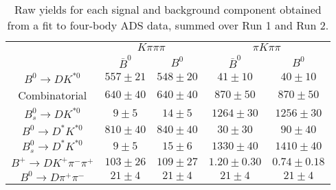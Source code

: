 \begin{table}
  \centering
  \begin{tabular}{ccccc}
      \toprule
       & \multicolumn{2}{c}{$K\pi\pi\pi$} & \multicolumn{2}{c}{$\pi K\pi\pi$} \\
      & $\bar{B}^0$ & $B^0$& $\bar{B}^0$ & $B^0$ \\
      \midrule
      $B^0 \to DK^{*0}$ & $557 \pm 21$ & $548 \pm 20$ & $41 \pm 10$ & $40 \pm 10$ \\
      Combinatorial & $640 \pm 40$ & $640 \pm 40$ & $870 \pm 50$ & $870 \pm 50$ \\
      $B^0_s \to DK^{*0}$ & $9 \pm 5$ & $14 \pm 5$ & $1264 \pm 30$ & $1256 \pm 30$ \\
      $B^0 \to D^*K^{*0}$ & $810 \pm 40$ & $840 \pm 40$ & $30 \pm 30$ & $90 \pm 40$ \\
      $B^0_s \to D^*K^{*0}$ & $9 \pm 5$ & $15 \pm 6$ & $1330 \pm 40$ & $1410 \pm 40$ \\
      $B^+ \to DK^+\pi^-\pi^+$ & $103 \pm 26$ & $109 \pm 27$ & $1.20 \pm 0.30$ & $0.74 \pm 0.18$ \\
      $B^0 \to D\pi^+\pi^-$ & $21 \pm 4$ & $21 \pm 4$ & $21 \pm 4$ & $21 \pm 4$ \\
      \bottomrule
      \end{tabular}
\caption{Raw yields for each signal and background component obtained from a fit to four-body ADS data, summed over Run 1 and Run 2.}
\label{tab:yields_split_4body_ADS}
\end{table}
